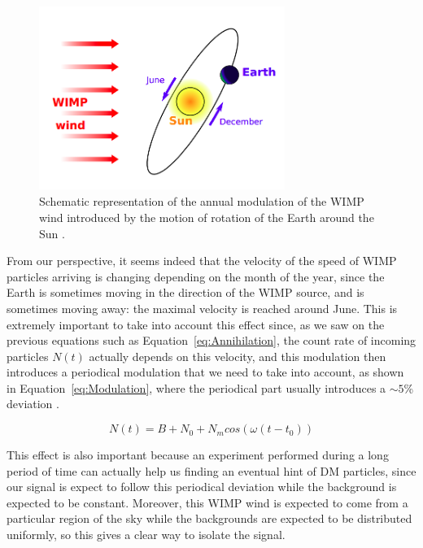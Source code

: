 \documentclass[a4paper, 10pt, openright]{report}
\begin{document}
\begin{figure}[htbp]
\begin{center}
\includegraphics[width=8cm, height=6cm]{figs/AnnualModulation.png}
\caption{Schematic representation of the annual modulation of the WIMP wind introduced by the motion of rotation of the Earth around the Sun \cite{AnnualModulation}.}
\label{fig:AnnualModulation}
\end{center}
\end{figure}

From our perspective, it seems indeed that the velocity of the speed of \ac{WIMP} particles arriving is changing depending on the month of the year, since the Earth is sometimes moving in the direction of the \ac{WIMP} source, and is sometimes moving away: the maximal velocity is reached around June. This is extremely important to take into account this effect since, as we saw on the previous equations such as Equation~\ref{eq:Annihilation}, the count rate of incoming particles $N(t)$ actually depends on this velocity, and this modulation then introduces a periodical modulation that we need to take into account, as shown in Equation~\ref{eq:Modulation}, where the periodical part usually introduces a $\sim5$\% deviation \cite{DirectSearches}.

\begin{equation}
\label{eq:Modulation}
N(t) = B + N_0 + N_m cos(\omega (t-t_0))
\end{equation}

This effect is also important because an experiment performed during a long period of time can actually help us finding an eventual hint of \ac{DM} particles, since our signal is expect to follow this periodical deviation while the background is expected to be constant. Moreover, this \ac{WIMP} wind is expected to come from a particular region of the sky while the backgrounds are expected to be distributed uniformly, so this gives a clear way to isolate the signal.
\end{document}
